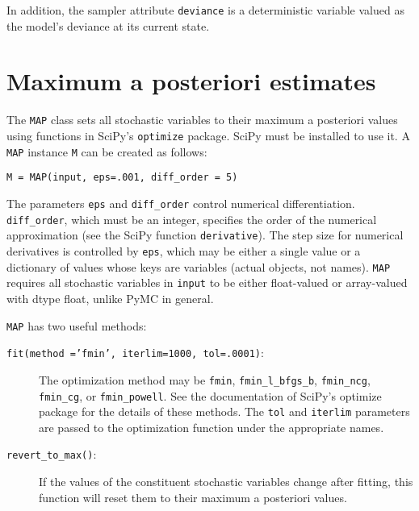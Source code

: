 In addition, the sampler attribute \texttt{deviance} is a deterministic variable valued as the model's deviance at its current state.

\hypertarget{MAP}{}
\section*{Maximum a posteriori estimates} \label{sec:MAP}

The \texttt{MAP} class sets all stochastic variables to their maximum a posteriori values using functions in SciPy's \texttt{optimize} package. SciPy must be installed to use it. A \texttt{MAP} instance \texttt{M} can be created as follows:
\begin{verbatim}
M = MAP(input, eps=.001, diff_order = 5)    
\end{verbatim}
The parameters \texttt{eps} and \texttt{diff_order} control numerical differentiation. \texttt{diff_order}, which must be an integer, specifies the order of the numerical approximation (see the SciPy function \texttt{derivative}). The step size for numerical derivatives is controlled by \texttt{eps}, which may be either a single value or a dictionary of values whose keys are variables (actual objects, not names). \texttt{MAP} requires all stochastic variables in \texttt{input} to be either float-valued or array-valued with dtype float, unlike PyMC in general.

\texttt{MAP} has two useful methods:
\begin{description}
    \item[\texttt{fit(method ='fmin', iterlim=1000, tol=.0001)}:] The optimization method may be \texttt{fmin}, \texttt{fmin_l_bfgs_b}, \texttt{fmin_ncg}, \texttt{fmin_cg}, or \texttt{fmin_powell}. See the documentation of SciPy's optimize package for the details of these methods. The \texttt{tol} and \texttt{iterlim} parameters are passed to the optimization function under the appropriate names.
    \item[\texttt{revert_to_max()}:] If the values of the constituent stochastic variables change after fitting, this function will reset them to their maximum a posteriori values.
\end{description}

